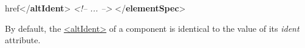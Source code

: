 \begin{shaded}
\hspace*{1em}\hspace*{1em}href{</\textbf{altIdent}>}\mbox{}\newline 
\hspace*{1em}\mbox{}\newline 
\textit{<!-- ... -->}\mbox{}\newline 
{}\mbox{}\newline 
{</\textbf{elementSpec}>}\end{shaded}\egroup\par \par
By default, the \hyperref[TEI.altIdent]{<altIdent>} of a component is identical to the value of its {\itshape ident} attribute.\par
